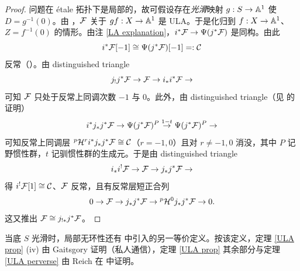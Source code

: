 \begin{proof}
问题在 \'etale 拓扑下是局部的，故可假设存在\emph{光滑}映射 $g: S\to {\mathbb A}^1$ 使 $D=g^{-1}(0)$。由 \cite[Lemma 2.14]{SGA4.5}，${\mathcal F}$ 关于 $gf: X\to {\mathbb A}^1$ 是 ULA。于是化归到 $f:X\to {\mathbb A}^1$、$Z=f^{-1}(0)$ 的情形。由注 \ref{LA explanation}，$i^*{\mathcal F}\to \Psi(j^*{\mathcal F})$ 是同构。由此
\[i^*{\mathcal F}[-1]\cong \Psi(j^*{\mathcal F})[-1]=:{\mathcal C}\]
反常（\cite[Corollary 4.5]{Il2}）。由 distinguished triangle
\[ j_!j^*{\mathcal F}\to {\mathcal F}\to i_*i^*{\mathcal F}\to\]
可知 ${\mathcal F}$ 只处于反常上同调次数 $-1$ 与 $0$。此外，由 distinguished triangle（见 \cite[Lemma 3.11]{SGA4.5} 的证明）
\[i^*j_*j^*{\mathcal F}\to \Psi(j^*{\mathcal F})^P\stackrel{1-t}{\to} \Psi(j^*{\mathcal F})^P\to\]
可知反常上同调层 ${^p}{\mathcal H}^r i^*j_*j^*{\mathcal F}\cong {\mathcal C}$（$r=-1,0$）且对 $r\neq -1,0$ 消没，其中 $P$ 记野惯性群，$t$ 记驯惯性群的生成元。于是由 distinguished triangle
\[i_*i^!{\mathcal F}\to {\mathcal F}\to j_*j^*{\mathcal F}\to\]
得 $i^!{\mathcal F}[1]\cong {\mathcal C}$、${\mathcal F}$ 反常，且有反常层短正合列
\[0\to {\mathcal F}\to j_*j^*{\mathcal F}\to {^p}{\mathcal H}^0j_*j^*{\mathcal F}\to 0.\]
这又推出 ${\mathcal F}\cong j_{!*}j^*{\mathcal F}$。
\end{proof}

\begin{rmk}
当底 $S$ 光滑时，局部无环性还有 \cite[\S~5.1,~Appendix B]{BGa} 中引入的另一等价定义。按该定义，定理 \ref{ULA prop} (iv) 由 Gaitsgory 证明（私人通信），定理 \ref{ULA prop} 其余部分与定理 \ref{ULA perverse} 由 Reich 在 \cite{Rei} 中证明。
\end{rmk}
